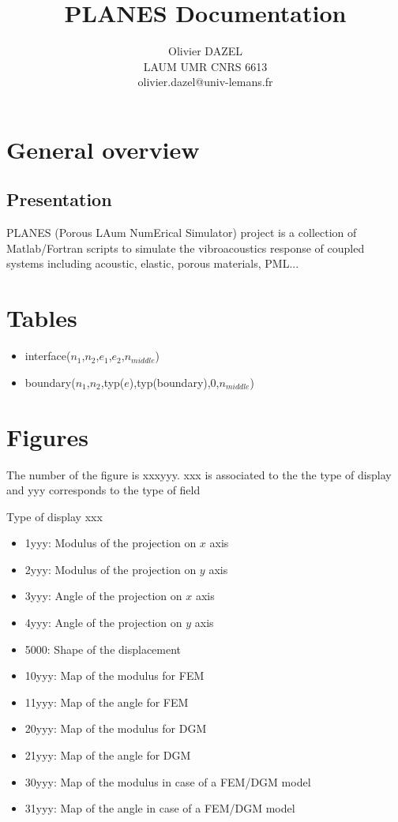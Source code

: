 \documentclass[11pt,A4paper]{book}
\title{PLANES Documentation}
\author{Olivier DAZEL\\
LAUM UMR CNRS 6613\\
olivier.dazel@univ-lemans.fr}
\renewcommand{\:}{\tb{:}}
\begin{document}
\maketitle

\tableofcontents


\chapter{General overview}

\section{Presentation}

PLANES (Porous LAum NumErical Simulator) project is a collection of Matlab/Fortran scripts to simulate the vibroacoustics response of coupled systems including acoustic, elastic, porous materials, PML... 





\chapter{Tables}
\begin{itemize}
\item interface($n_1$,$n_2$,$e_1$,$e_2$,$n_{middle}$)
\item boundary($n_1$,$n_2$,typ($e$),typ(boundary),0,$n_{middle}$)
\end{itemize}


\chapter{Figures}


The number of the figure is xxxyyy. xxx is associated to the the type of display and yyy corresponds to the type of field

Type of display xxx
\begin{itemize}
	\item  1yyy: Modulus of the projection on $x$ axis
	\item  2yyy: Modulus of the projection on $y$ axis
	\item  3yyy: Angle of the projection on $x$ axis
	\item  4yyy: Angle of the projection on $y$ axis  
	\item  5000: Shape of the displacement
	\item 10yyy: Map of the modulus for FEM
	\item 11yyy: Map of the angle for FEM
	\item 20yyy: Map of the modulus for DGM
	\item 21yyy: Map of the angle for DGM
	\item 30yyy: Map of the modulus in case of a FEM/DGM model
	\item 31yyy: Map of the angle in case of a FEM/DGM model
\end{itemize}
\end{document}
